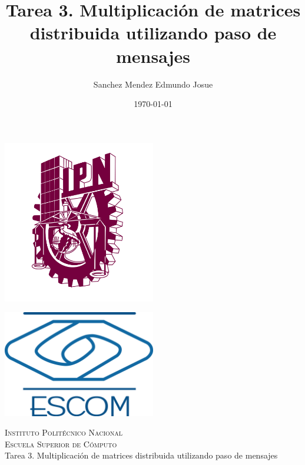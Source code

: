 \documentclass[11pt]{article}
\date{\today}
\title{Tarea 3. Multiplicación de matrices distribuida utilizando paso de mensajes}
\author{Sanchez Mendez Edmundo Josue}
\begin{document}
		\begin{titlepage}
			\begin{center}
				
				
				\noindent
				\begin{minipage}{0.5\textwidth}
					\begin{flushleft} \large
						\includegraphics[width=0.5\textwidth]{resources/ipn.png}
					\end{flushleft}
				\end{minipage}%
				\begin{minipage}{0.55\textwidth}
					\begin{flushright} \large
						\includegraphics[width=0.5\textwidth]{resources/escom.png}
					\end{flushright}
				\end{minipage}
				
				\textsc{\LARGE Instituto Politécnico Nacional}\\[0.5cm]
				
				\textsc{\Large Escuela Superior de Cómputo}\\[1cm]
				
				
				{ \huge Tarea 3. Multiplicación de matrices distribuida utilizando paso de mensajes  \\[1cm] }
				

\end{center}
\end{titlepage}
\end{document}
